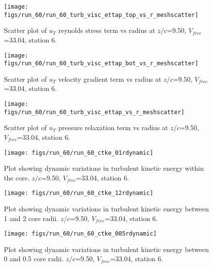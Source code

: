 \begin{figure}[H]
\centering
\texttt{[image: figs/run\_60/run\_60\_turb\_visc\_ettap\_top\_vs\_r\_meshscatter]}
\caption{Scatter plot of $
u_T$ reynolds stress term vs radius at $z/c$=9.50, $V_{free}$=33.04, station 6.}
\label{fig:run_60_turb_visc_ettap_top_vs_r_meshscatter}
\end{figure}


\begin{figure}[H]
\centering
\texttt{[image: figs/run\_60/run\_60\_turb\_visc\_ettap\_bot\_vs\_r\_meshscatter]}
\caption{Scatter plot of $
u_T$ velocity gradient term vs radius at $z/c$=9.50, $V_{free}$=33.04, station 6.}
\label{fig:run_60_turb_visc_ettap_bot_vs_r_meshscatter}
\end{figure}


\begin{figure}[H]
\centering
\texttt{[image: figs/run\_60/run\_60\_turb\_visc\_ettap\_vs\_r\_meshscatter]}
\caption{Scatter plot of $
u_T$ pressure relaxation term vs radius at $z/c$=9.50, $V_{free}$=33.04, station 6.}
\label{fig:run_60_turb_visc_ettap_vs_r_meshscatter}
\end{figure}


\begin{figure}[H]
\centering
\texttt{[image: figs/run\_60/run\_60\_ctke\_01rdynamic]}
\caption{Plot showing dynamic variations in turbulent kinetic energy within the core. $z/c$=9.50, $V_{free}$=33.04, station 6.}
\label{fig:run_60_ctke_01rdynamic}
\end{figure}


\begin{figure}[H]
\centering
\texttt{[image: figs/run\_60/run\_60\_ctke\_12rdynamic]}
\caption{Plot showing dynamic variations in turbulent kinetic energy between 1 and 2 core radii. $z/c$=9.50, $V_{free}$=33.04, station 6.}
\label{fig:run_60_ctke_12rdynamic}
\end{figure}


\begin{figure}[H]
\centering
\texttt{[image: figs/run\_60/run\_60\_ctke\_005rdynamic]}
\caption{Plot showing dynamic variations in turbulent kinetic energy between 0 and 0.5 core radii. $z/c$=9.50, $V_{free}$=33.04, station 6.}
\label{fig:run_60_ctke_005rdynamic}
\end{figure}


